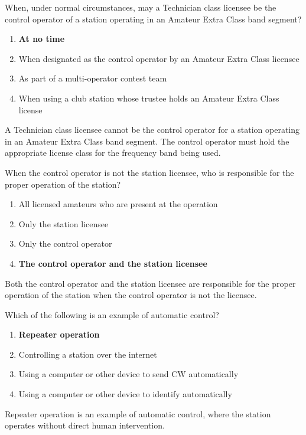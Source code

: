 
\begin{tcolorbox}[colback=gray!10!white,colframe=black!75!black,title={T1E06}]
When, under normal circumstances, may a Technician class licensee be the control operator of a station operating in an Amateur Extra Class band segment?
\begin{enumerate}[label=\Alph*),noitemsep]
    \item \textbf{At no time}
    \item When designated as the control operator by an Amateur Extra Class licensee
    \item As part of a multi-operator contest team
    \item When using a club station whose trustee holds an Amateur Extra Class license
\end{enumerate}
\end{tcolorbox}
A Technician class licensee cannot be the control operator for a station operating in an Amateur Extra Class band segment. The control operator must hold the appropriate license class for the frequency band being used.


\begin{tcolorbox}[colback=gray!10!white,colframe=black!75!black,title={T1E07}]
When the control operator is not the station licensee, who is responsible for the proper operation of the station?
\begin{enumerate}[label=\Alph*),noitemsep]
    \item All licensed amateurs who are present at the operation
    \item Only the station licensee
    \item Only the control operator
    \item \textbf{The control operator and the station licensee}
\end{enumerate}
\end{tcolorbox}
Both the control operator and the station licensee are responsible for the proper operation of the station when the control operator is not the licensee.


\begin{tcolorbox}[colback=gray!10!white,colframe=black!75!black,title={T1E08}]
Which of the following is an example of automatic control?
\begin{enumerate}[label=\Alph*),noitemsep]
    \item \textbf{Repeater operation}
    \item Controlling a station over the internet
    \item Using a computer or other device to send CW automatically
    \item Using a computer or other device to identify automatically
\end{enumerate}
\end{tcolorbox}
Repeater operation is an example of automatic control, where the station operates without direct human intervention.

